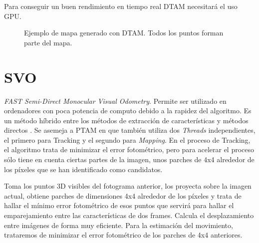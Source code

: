 Para conseguir un buen rendimiento en tiempo real DTAM necesitará el uso GPU.




\begin{figure}[H]
\begin{center}
\end{center}
\caption{Ejemplo de mapa generado con DTAM. Todos los puntos forman parte del mapa.}
\end{figure}

\section{SVO}
\textit{FAST Semi-Direct Monocular Visual Odometry}.
Permite ser utilizado en ordenadores con poca potencia de computo debido a la rapidez del algoritmo.
Es un método híbrido entre los métodos de extracción de características y métodos directos
\cite{Forster2017svo}. 
Se asemeja a PTAM en que también utiliza dos \textit{Threads} independientes, el primero para Tracking y el segundo para \textit{Mapping}.
En el proceso de Tracking, el algoritmo trata de minimizar el error fotométrico, pero para acelerar el proceso sólo tiene en cuenta ciertas partes de la imagen, unos parches de 4x4 alrededor de los píxeles que se han identificado como candidatos.

Toma los puntos 3D visibles del fotograma anterior, los proyecta sobre la imagen actual, obtiene parches de dimensiones 4x4 alrededor de los píxeles y trata de hallar  el mínimo error fotométrico de esos puntos que servirá para hallar el emparejamiento entre las características de dos frames. Calcula el desplazamiento entre imágenes de forma muy eficiente.
Para la estimación del movimiento, trataremos de minimizar el error fotométrico de los parches de 4x4 anteriores.


